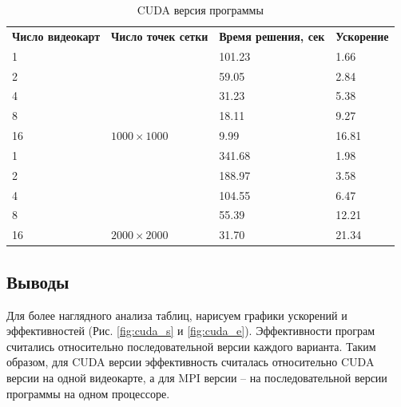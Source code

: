 \documentclass[12pt, a4paper]{article}
\begin{document}
        \begin{table}[H]
            \centering
            \caption{CUDA версия программы}
            \label{tab:lom_cuda}
            \begin{tabular}{llll}
            \rowcolor[HTML]{C0C0C0}
            \textbf{Число видеокарт} & \textbf{Число точек сетки}           & \textbf{Время решения, сек} & \textbf{Ускорение} \\
            \rowcolor[HTML]{EFEFEF}
            1                        &                                      & 101.23                      & 1.66               \\
            2                        &                                      & 59.05                       & 2.84               \\
            4                        &                                      & 31.23                       & 5.38               \\
            8                        &                                      & 18.11                       & 9.27               \\
            16                       & \multirow{-4}{*}{$1000 \times 1000$} & 9.99                        & 16.81              \\
            \rowcolor[HTML]{EFEFEF}
            1                        &                                      & 341.68                      & 1.98               \\
            2                        &                                      & 188.97                      & 3.58               \\
            4                        &                                      & 104.55                      & 6.47               \\
            8                        &                                      & 55.39                       & 12.21              \\
            16                       & \multirow{-4}{*}{$2000 \times 2000$} & 31.70                       & 21.34
            \end{tabular}
        \end{table}

        \subsection{Выводы}
            Для более наглядного анализа таблиц, нарисуем графики ускорений и эффективностей (Рис. \ref{fig:cuda_s} и \ref{fig:cuda_e}). Эффективности програм считались относительно последовательной версии каждого варианта. Таким образом, для CUDA версии эффективность считалась относительно CUDA версии на одной видеокарте, а для MPI версии -- на последовательной версии программы на одном процессоре.
\end{document}
